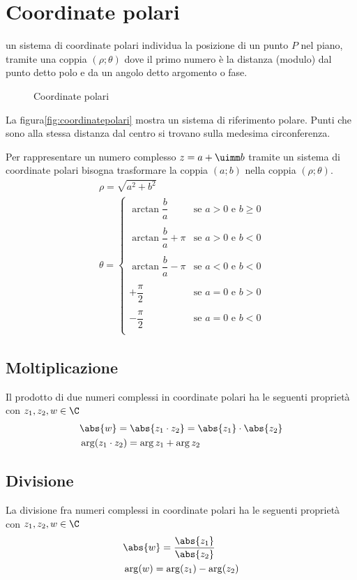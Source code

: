 \section{Coordinate polari}
\begin{definizione}
un sistema di coordinate polari individua la posizione di un punto $P$ nel piano, tramite una coppia $(\rho;\theta)$ dove il primo numero è la distanza (modulo) dal punto detto polo e da un angolo detto argomento o fase.
\end{definizione}
\begin{figure} %
	\centering

	\caption{Coordinate polari}
	\label{fig:coordinatepolari}
\end{figure}
La figura\nobs\vref{fig:coordinatepolari} mostra un sistema di riferimento polare. Punti che sono alla stessa distanza dal centro si trovano sulla medesima circonferenza. 

Per rappresentare un numero complesso $z=a+\uimm b$ tramite un sistema di coordinate polari bisogna trasformare la coppia $(a;b)$
nella coppia $(\rho;\theta)$.
\begin{align*}
&\rho=\sqrt{a^2+b^2}\\
&\theta=\begin{cases}
\arctan{\dfrac{b}{a}}&\text{se $a>0$ e $b\geq 0$ }\\
&\\
\arctan{\dfrac{b}{a}}+\pi&\text{se $a>0$ e $b< 0$ }\\
&\\
\arctan{\dfrac{b}{a}}-\pi&\text{se $a<0$ e $b< 0$ }\\
&\\
+\dfrac{\pi}{2}&\text{se $a=0$ e $b> 0$ }\\
&\\
-\dfrac{\pi}{2}&\text{se $a=0$ e $b< 0$ }\\
\end{cases}
\end{align*} 
\subsection{Moltiplicazione}
Il prodotto di due numeri complessi in coordinate polari ha le seguenti proprietà  con $z_1,z_2,w\in \C$ 
\begin{align*}
&\abs{w}=\abs{z_1\cdot z_2}=\abs{z_1}\cdot\abs{z_2}\\
&\arg(z_1\cdot z_2)=\arg{z_1}+\arg{z_2}
\end{align*} 
\subsection{Divisione}
La divisione fra numeri complessi in coordinate polari ha le seguenti proprietà con $z_1,z_2,w\in \C$ 
\begin{align*}
&\abs{w}=\dfrac{\abs{z_1}}{\abs{z_2}}\\
&\arg(w)=\arg (z_1)-\arg (z_2)
\end{align*}
